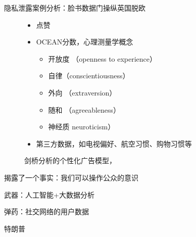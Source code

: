 \documentclass[11pt]{beamer}
\begin{document}
\begin{frame}[allowframebreaks]{隐私泄露案例分析：脸书数据门操纵英国脱欧}
\newpage
\begin{figure}
	\begin{itemize}
		\item 点赞
		\item OCEAN分数，心理测量学概念
		\begin{itemize}
			\item 开放度 （openness to experience）
			\item 自律（conscientiousness）
			\item 外向 （extraversion）
			\item 随和 （agreeableness）
			\item 神经质 neuroticism）
		\end{itemize}
		\item 第三方数据，如电视偏好、航空习惯、购物习惯等
	\end{itemize}
	\caption{剑桥分析的个性化广告模型， }
\end{figure}
\newpage

揭露了一个事实：我们可以操作公众的意识

武器：人工智能+大数据分析

弹药：社交网络的用户数据

\newpage

	\newpage
	特朗普
	
	\begin{figure}[htbp]
		\centering
		

\end{figure}
\end{frame}
\end{document}
